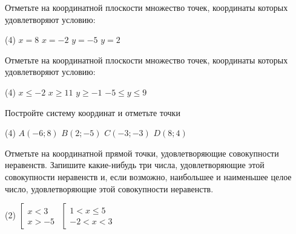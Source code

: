 \begin{homework}[number=3]
	\begin{listofex}
		\item Отметьте на координатной плоскости множество точек, координаты которых удовлетворяют условию:
		\begin{tasks}(4)
			\task \( x=8 \)
			\task \( x=-2 \)
			\task \( y=-5 \)
			\task \( y=2 \)
		\end{tasks}
			\item Отметьте на координатной плоскости множество точек, координаты которых удовлетворяют условию:
		\begin{tasks}(4)
			\task \( x \le -2 \)
			\task \( x \ge 11 \)
			\task \( y \ge -1 \)
			\task \( -5 \le y \le 9 \)
		\end{tasks}
		\item Постройте систему координат и отметьте точки
		\begin{tasks}(4)
			\task \( A(-6;8) \)
			\task \( B(2;-5) \)
			\task \( C(-3;-3) \)
			\task \( D(8;4) \)
		\end{tasks}
		\item Отметьте на координатной прямой точки, удовлетворяющие совокупности неравенств. Запишите какие-нибудь три числа, удовлетворяющие этой совокупности неравенств и, если возможно, наибольшее и наименьшее целое число, удовлетворяющие этой совокупности неравенств.
		\begin{tasks}(2)
			\task \( \left[ 
			\begin{array}{l} x<3\\ x>-5 \end{array} \right. \)
			\task \( \left[
			\begin{array}{l} 1 <x \le 5 \\ -2 < x < 3 \end{array} \right. \)
		\end{tasks}
	\end{listofex}
\end{homework}

